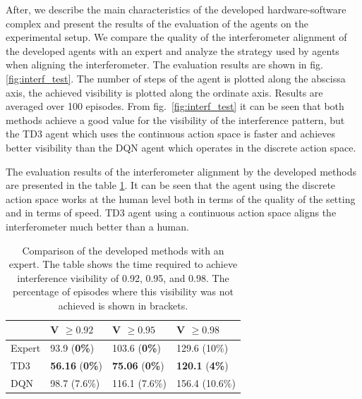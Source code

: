 After, we describe the main characteristics of the developed hardware-software complex and present the results of the evaluation of the agents on the experimental setup. We compare the quality of the interferometer alignment of the developed agents with an expert and analyze the strategy used by agents when aligning the interferometer. The evaluation results are shown in fig.~ \ref{fig:interf_test}. The number of steps of the agent is plotted along the abscissa axis, the achieved visibility is plotted along the ordinate axis. Results are averaged over 100 episodes. From fig.~\ref{fig:interf_test} it can be seen that both methods achieve a good value for the visibility of the interference pattern, but the TD3 agent which uses the continuous action space is faster and achieves better visibility than the DQN agent which operates in the discrete action space.

The evaluation results of the interferometer alignment by the developed methods are presented in the table \ref{tab:human}. It can be seen that the agent using the discrete action space works at the human level both in terms of the quality of the setting and in terms of speed. TD3 agent using a continuous action space aligns the interferometer much better than a human.

\begin{table} [htbp]
    \centering
    \begin{threeparttable}
        \caption{Comparison of the developed methods with an expert. The table shows the time required to achieve interference visibility of 0.92, 0.95, and 0.98. The percentage of episodes where this visibility was not achieved is shown in brackets.}
        \label{tab:human}
        \begin{tabular}{| p{2.5cm} || p{2.5cm} | p{2.5cm} | p{2.5cm} |}
            \hline
            \hline
            &V $\ge 0.92$ & V $\ge 0.95$ & V $\ge 0.98$\\
            \hline
            Expert &  93.9 (\textbf{0\%})  & 103.6 (\textbf{0\%}) & 129.6 (10\%)\\
            TD3 &  \textbf{56.16} (\textbf{0\%}) & \textbf{75.06} (\textbf{0\%}) & \textbf{120.1} (\textbf{4\%})\\
            DQN &  98.7 (7.6\%) & 116.1 (7.6\%) & 156.4 (10.6\%)\\
            \hline
            \hline
        \end{tabular}
    \end{threeparttable}
\end{table}

